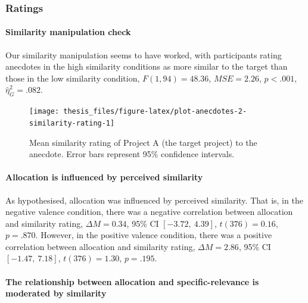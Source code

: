 \documentclass[a4paper, nobind, dvipsnames]{templates/ociamthesis}
\theoremstyle{definition}
\theoremstyle{definition}
\theoremstyle{definition}
\theoremstyle{definition}
\theoremstyle{remark}
\begin{document}
\hypertarget{ratings}{%
\subsubsection{Ratings}\label{ratings}}

\hypertarget{similarity-manipulation-check-1}{%
\paragraph{Similarity manipulation check}\label{similarity-manipulation-check-1}}

Our similarity manipulation seems to have worked, with participants rating
anecdotes in the high similarity conditions as more similar to the target than
those in the low similarity condition,
\(F(1, 94) = 48.36\), \(\mathit{MSE} = 2.26\), \(p < .001\), \(\hat{\eta}^2_G = .082\).



\begin{figure}
\texttt{[image: thesis\_files/figure-latex/plot-anecdotes-2-similarity-rating-1]} \caption{Mean similarity rating of Project A (the target project) to the anecdote. Error bars represent 95\% confidence intervals.}\label{fig:plot-anecdotes-2-similarity-rating}
\end{figure}

\hypertarget{allocation-is-influenced-by-perceived-similarity}{%
\paragraph{Allocation is influenced by perceived similarity}\label{allocation-is-influenced-by-perceived-similarity}}

As hypothesised, allocation was influenced by perceived similarity. That is, in
the negative valence condition, there was a negative correlation between
allocation and similarity rating,
\(\Delta M = 0.34\), 95\% CI \([-3.72,~4.39]\), \(t(376) = 0.16\), \(p = .870\).
However, in the positive valence condition,
there was a positive correlation between allocation and similarity rating,
\(\Delta M = 2.86\), 95\% CI \([-1.47,~7.18]\), \(t(376) = 1.30\), \(p = .195\).

\hypertarget{the-relationship-between-allocation-and-specific-relevance-is-moderated-by-similarity}{%
\paragraph{The relationship between allocation and specific-relevance is moderated by similarity}\label{the-relationship-between-allocation-and-specific-relevance-is-moderated-by-similarity}}
\end{document}

